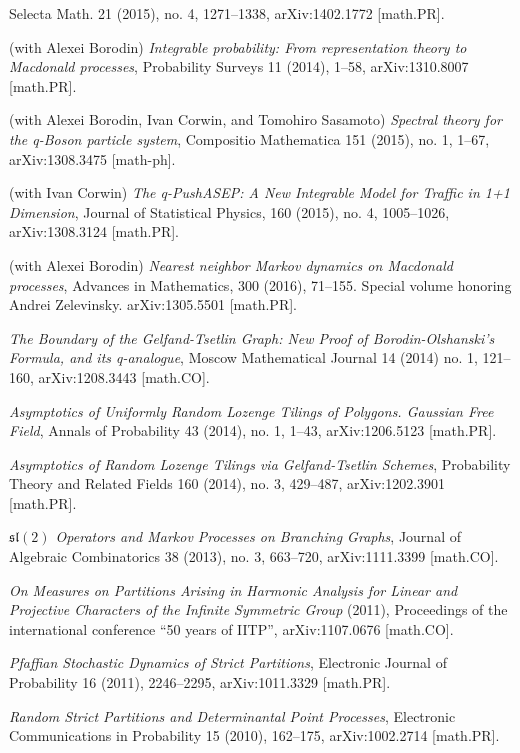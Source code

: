 \documentclass[letterpaper,11pt]{article}
\begin{document}
\begin{etaremune}
    Selecta Math. 21 (2015), no. 4, 
    1271--1338,
    arXiv:1402.1772 [math.PR].
    \item (with Alexei Borodin) 
    \emph{Integrable probability: From representation theory to Macdonald processes}, 
    Probability Surveys 11 (2014), 1--58, arXiv:1310.8007 [math.PR]. 
    \item (with Alexei Borodin, Ivan Corwin, and Tomohiro Sasamoto)
    \emph{Spectral theory for the q-Boson particle system},
    Compositio Mathematica 151 (2015), no. 1, 1--67,
    arXiv:1308.3475 [math-ph]. 
    \item (with Ivan Corwin)
    \emph{The q-PushASEP: A New Integrable Model for Traffic in 1+1 Dimension},
    Journal of Statistical Physics,
    160 (2015), no. 4, 1005--1026,
    arXiv:1308.3124 [math.PR].
    \item (with Alexei Borodin) 
    \emph{Nearest neighbor Markov dynamics on 
    Macdonald processes},
    Advances in Mathematics, 300 (2016), 71--155. Special volume honoring Andrei Zelevinsky.
    arXiv:1305.5501 [math.PR].
    \item \emph{The Boundary of the Gelfand-Tsetlin Graph: New Proof of Borodin-Olshanski's Formula, and its q-analogue}, 
    Moscow Mathematical Journal 14 (2014) no. 1, 121--160,
    arXiv:1208.3443 [math.CO].
    \item \emph{Asymptotics of Uniformly Random Lozenge Tilings of Polygons. Gaussian Free Field}, 
    Annals of Probability 43 (2014), no. 1, 1--43,
    arXiv:1206.5123 [math.PR].
    \item \emph{Asymptotics of Random Lozenge Tilings via Gelfand-Tsetlin Schemes}, 
    Probability Theory and Related Fields 160 (2014), no. 3, 429--487,
    arXiv:1202.3901 [math.PR].
    \item \emph{$\mathfrak{sl}(2)$ Operators and Markov Processes on Branching Graphs},
    Journal of Algebraic Combinatorics 38 (2013), no. 3, 663--720,
    arXiv:1111.3399 [math.CO].
    \item \emph{On Measures on Partitions Arising in Harmonic Analysis for Linear and Projective Characters of the Infinite Symmetric Group} (2011), Proceedings of the international conference ``50 years of IITP'', arXiv:1107.0676 [math.CO].
    \item  \emph{Pfaffian Stochastic Dynamics of Strict Partitions},  Electronic Journal of Probability 16 (2011), 2246--2295, arXiv:1011.3329 [math.PR].
    \item \emph{Random Strict Partitions and Determinantal Point Processes}, Electronic Communications in Probability 15 (2010), 162--175, arXiv:1002.2714 [math.PR].

\end{etaremune}
\end{document}
